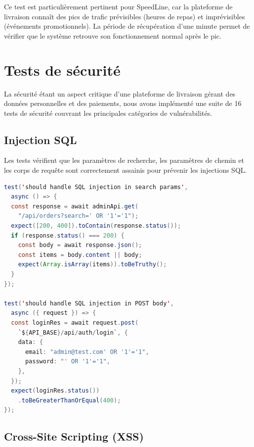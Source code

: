 Ce test est particulièrement pertinent pour SpeedLine, car la plateforme de livraison
connaît des pics de trafic prévisibles (heures de repas) et imprévisibles (événements
promotionnels). La période de récupération d'une minute permet de vérifier que le
système retrouve son fonctionnement normal après le pic.

\section{Tests de sécurité}
\label{sec:tests-securite}

La sécurité étant un aspect critique d'une plateforme de livraison gérant des données
personnelles et des paiements, nous avons implémenté une suite de 16 tests de sécurité
couvrant les principales catégories de vulnérabilités.

\subsection{Injection SQL}

Les tests vérifient que les paramètres de recherche, les paramètres de chemin et les
corps de requête sont correctement assainis pour prévenir les injections SQL.

\begin{lstlisting}[language=Java, caption={Tests d'injection SQL -- security.api.spec.ts}, label={lst:sql-injection}]
test('should handle SQL injection in search params',
  async () => {
  const response = await adminApi.get(
    "/api/orders?search=' OR '1'='1");
  expect([200, 400]).toContain(response.status());
  if (response.status() === 200) {
    const body = await response.json();
    const items = body.content || body;
    expect(Array.isArray(items)).toBeTruthy();
  }
});

test('should handle SQL injection in POST body',
  async ({ request }) => {
  const loginRes = await request.post(
    `${API_BASE}/api/auth/login`, {
    data: {
      email: "admin@test.com' OR '1'='1",
      password: "' OR '1'='1",
    },
  });
  expect(loginRes.status())
    .toBeGreaterThanOrEqual(400);
});
\end{lstlisting}

\subsection{Cross-Site Scripting (XSS)}

